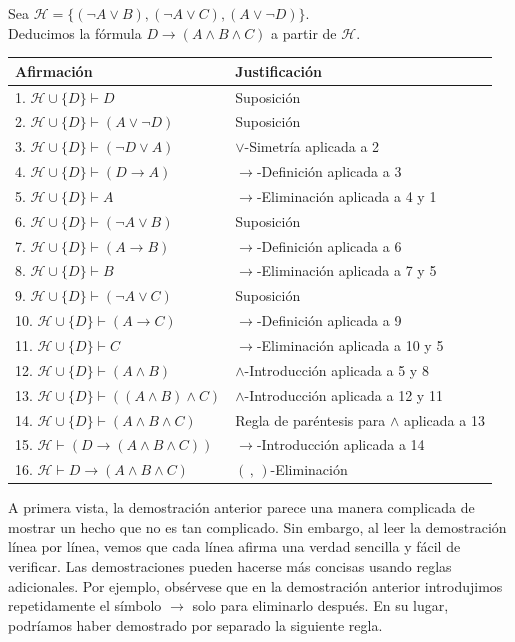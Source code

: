 \message{ !name(main.tex)}\documentclass[12pt,a4paper]{book}
\makeatletter
\newcommand{\HH}{\mathcal{H}}
\newenvironment{derivacion}{%
  \begingroup
  \renewcommand{\arraystretch}{1.35}
  \begin{center}
  \begin{tabular}{@{}l l@{}}
    \textbf{Afirmación} & \textbf{Justificación}\\
    \hline
}{%
  \end{tabular}
  \end{center}
  \endgroup
}
\makeatother
\begin{document}
    \begin{ejemplo}\label{ej:demostracion-formal-ejemplo}
        Sea $\HH=\{(\neg A\vee B),(\neg A\vee C),(A\vee\neg D)\}$.\\
        Deducimos la fórmula $D\rightarrow(A\wedge B\wedge C)$ a partir de $\HH$.

        \begin{derivacion}
            1. $\HH\cup\{D\}\vdash D$ & Suposición\\
            2. $\HH\cup\{D\}\vdash(A\vee\neg D)$ & Suposición\\
            3. $\HH\cup\{D\}\vdash(\neg D\vee A)$ & $\vee$-Simetría aplicada a 2\\
            4. $\HH\cup\{D\}\vdash(D\rightarrow A)$ & $\rightarrow$-Definición aplicada a 3\\
            5. $\HH\cup\{D\}\vdash A$ & $\rightarrow$-Eliminación aplicada a 4 y 1\\
            6. $\HH\cup\{D\}\vdash(\neg A\vee B)$ & Suposición\\
            7. $\HH\cup\{D\}\vdash(A\rightarrow B)$ & $\rightarrow$-Definición aplicada a 6\\
            8. $\HH\cup\{D\}\vdash B$ & $\rightarrow$-Eliminación aplicada a 7 y 5\\
            9. $\HH\cup\{D\}\vdash(\neg A\vee C)$ & Suposición\\
            10. $\HH\cup\{D\}\vdash(A\rightarrow C)$ & $\rightarrow$-Definición aplicada a 9\\
            11. $\HH\cup\{D\}\vdash C$ & $\rightarrow$-Eliminación aplicada a 10 y 5\\
            12. $\HH\cup\{D\}\vdash(A\wedge B)$ & $\wedge$-Introducción aplicada a 5 y 8\\
            13. $\HH\cup\{D\}\vdash((A\wedge B)\wedge C)$ & $\wedge$-Introducción aplicada a 12 y 11\\
            14. $\HH\cup\{D\}\vdash(A\wedge B\wedge C)$ & Regla de paréntesis para $\wedge$ aplicada a 13\\
            15. $\HH\vdash(D\rightarrow(A\wedge B\wedge C))$ & $\rightarrow$-Introducción aplicada a 14\\
            16. $\HH\vdash D\rightarrow(A\wedge B\wedge C)$ & $(\,,\,)$-Eliminación\\
        \end{derivacion}
    \end{ejemplo}

    A primera vista, la demostración anterior parece una manera complicada de mostrar un hecho que no es tan complicado. Sin
    embargo, al leer la demostración línea por línea, vemos que cada línea afirma una verdad sencilla y fácil de verificar. Las
    demostraciones pueden hacerse más concisas usando reglas adicionales. Por ejemplo, obsérvese que en la demostración anterior
    introdujimos repetidamente el símbolo $\rightarrow$ solo para eliminarlo después. En su lugar, podríamos haber demostrado por
    separado la siguiente regla.
\end{document}
